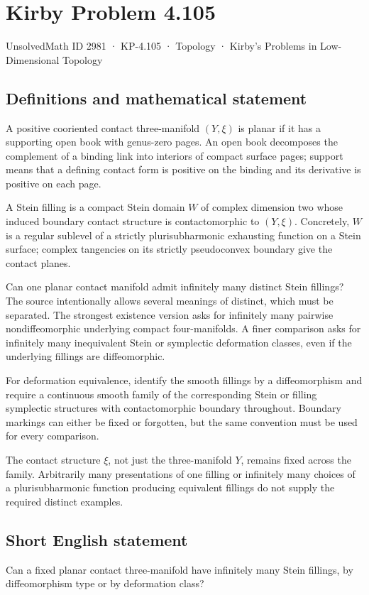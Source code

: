\documentclass[11pt,a4paper]{article}
\begin{document}
\section*{Kirby Problem 4.105}\label{2981}
{\small UnsolvedMath ID 2981 · KP-4.105 · Topology · Kirby's Problems in Low-Dimensional Topology}
\subsection{Definitions and mathematical statement}
A positive cooriented contact three-manifold $(Y,\xi)$ is planar if it has a supporting open book with genus-zero pages. An open book decomposes the complement of a binding link into interiors of compact surface pages; support means that a defining contact form is positive on the binding and its derivative is positive on each page.

A Stein filling is a compact Stein domain $W$ of complex dimension two whose induced boundary contact structure is contactomorphic to $(Y,\xi)$. Concretely, $W$ is a regular sublevel of a strictly plurisubharmonic exhausting function on a Stein surface; complex tangencies on its strictly pseudoconvex boundary give the contact planes.

Can one planar contact manifold admit infinitely many distinct Stein fillings? The source intentionally allows several meanings of distinct, which must be separated. The strongest existence version asks for infinitely many pairwise nondiffeomorphic underlying compact four-manifolds. A finer comparison asks for infinitely many inequivalent Stein or symplectic deformation classes, even if the underlying fillings are diffeomorphic.

For deformation equivalence, identify the smooth fillings by a diffeomorphism and require a continuous smooth family of the corresponding Stein or filling symplectic structures with contactomorphic boundary throughout. Boundary markings can either be fixed or forgotten, but the same convention must be used for every comparison.

The contact structure $\xi$, not just the three-manifold $Y$, remains fixed across the family. Arbitrarily many presentations of one filling or infinitely many choices of a plurisubharmonic function producing equivalent fillings do not supply the required distinct examples.
\subsection{Short English statement}
Can a fixed planar contact three-manifold have infinitely many Stein fillings, by diffeomorphism type or by deformation class?
\end{document}
